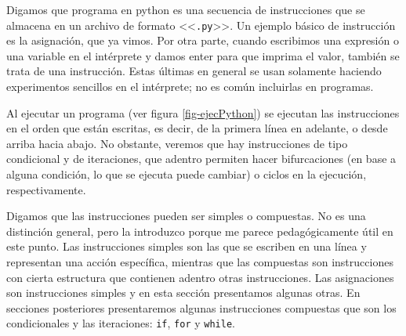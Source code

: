 \documentclass[a4paper, 12pt]{report}
\theoremstyle{definition}
\begin{document}
Digamos que programa en python es una secuencia de instrucciones que se almacena en un archivo de formato <<{\tt .py}>>. Un ejemplo básico de instrucción es la asignación, que ya vimos. Por otra parte, cuando escribimos una expresión o una variable en el intérprete y damos enter para que imprima el valor, también se trata de una instrucción. Estas últimas en general se usan solamente haciendo experimentos sencillos en el intérprete; no es común incluirlas en programas.

Al ejecutar un programa (ver figura \ref{fig-ejecPython}) se ejecutan las instrucciones en el orden que están escritas, es decir, de la primera línea en adelante, o desde arriba hacia abajo. No obstante, veremos que hay instrucciones de tipo condicional y de iteraciones, que adentro permiten hacer bifurcaciones (en base a alguna condición, lo que se ejecuta puede cambiar) o ciclos en la ejecución, respectivamente.

Digamos que las instrucciones pueden ser simples o compuestas. No es una distinción general, pero la introduzco porque me parece pedagógicamente útil en este punto. Las instrucciones simples son las que se escriben en una línea y representan una acción específica, mientras que las compuestas son instrucciones con cierta estructura que contienen adentro otras instrucciones. Las asignaciones son instrucciones simples y en esta sección presentamos algunas otras. En secciones posteriores presentaremos algunas instrucciones compuestas que son los condicionales y las iteraciones: {\tt if}, {\tt for} y {\tt while}.
\end{document}

